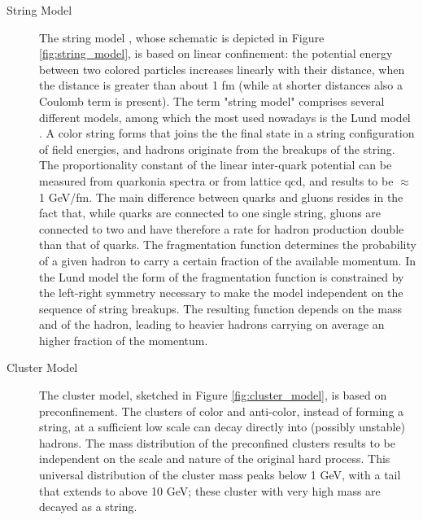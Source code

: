 \begin{description}
\item[String Model] The string model \cite{Artru:1974hr}, whose schematic is depicted in Figure \ref{fig:string_model}, is based on linear confinement: the potential energy between two colored particles increases linearly with their distance, when the distance is greater than about 1 fm (while at shorter distances also a Coulomb term is present). The term "string model" comprises several different models, among which the most used nowadays is the Lund model \cite{Andersson:1983ia,Andersson:1998tv}. 
A color string forms that joins the the final state in a string configuration of field energies, and hadrons originate from the breakups of the string. The proportionality constant of the linear inter-quark potential can be measured from quarkonia spectra or from lattice \gls{qcd}, and results to be $\approx$ 1 GeV/fm.
The main difference between quarks and gluons resides in the fact that, while quarks are connected to one single string, gluons are connected to two and have therefore a rate for hadron production double than that of quarks. 
The fragmentation function determines the probability of a given hadron to carry a certain fraction of the available momentum. In the Lund model the form of the fragmentation function is constrained by the left-right symmetry necessary to make the model independent on the sequence of string breakups. The resulting function depends on the mass and \pt of the hadron, leading to heavier hadrons carrying on average an higher fraction of the momentum.

\item[Cluster Model] The cluster model, sketched in Figure \ref{fig:cluster_model}, is based on preconfinement. The clusters of color and anti-color, instead of forming a string, at a sufficient low scale can decay directly into (possibly unstable) hadrons. The mass distribution of the preconfined clusters results to be independent on the scale and nature of the original hard process. This universal distribution of the cluster mass peaks below 1 GeV, with a tail that extends to above 10 GeV; these cluster with very high mass are decayed as a string.  

\end{description}


